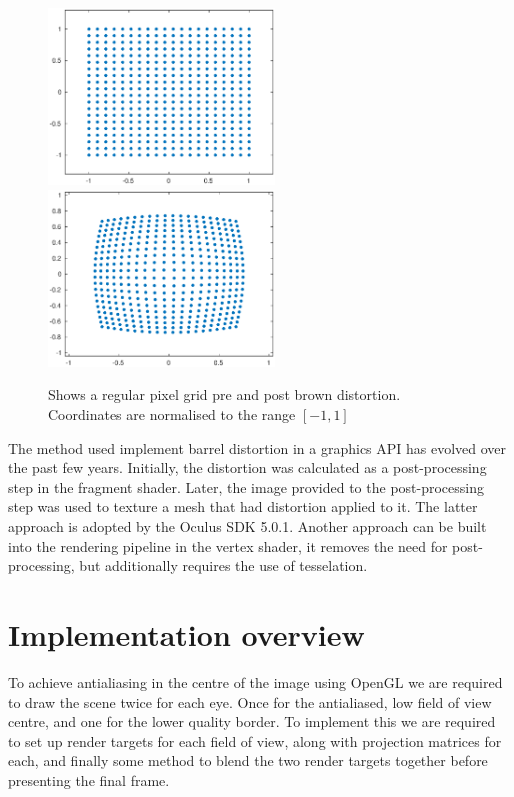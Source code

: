 \documentclass[12pt,a4paper,twoside,openright]{report}
\begin{document}
\begin{figure}[tbh]
\begin{center}
\includegraphics[width=6cm]{figs/pre_distortion.eps}
\includegraphics[width=6cm]{figs/post_distortion.eps}
\caption{Shows a regular pixel grid pre and post brown distortion. Coordinates are normalised to the range $[-1,1]$}
\label{epsfig1}
\end{center}
\end{figure}

The method used implement barrel distortion in a graphics API has evolved over the past few years. Initially, the distortion was calculated as a post-processing step in the fragment shader. Later, the image provided to the post-processing step was used to texture a mesh that had distortion applied to it. The latter approach is adopted by the Oculus SDK 5.0.1. Another approach can be built into the rendering pipeline in the vertex shader, it removes the need for post-processing, but additionally requires the use of tesselation.

\section{Implementation overview} 

To achieve antialiasing in the centre of the image using OpenGL we are required to draw the scene twice for each eye. Once for the antialiased, low field of view centre, and one for the lower quality border. To implement this we are required to set up render targets for each field of view, along with projection matrices for each, and finally some method to blend the two render targets together before presenting the final frame.
\end{document}
